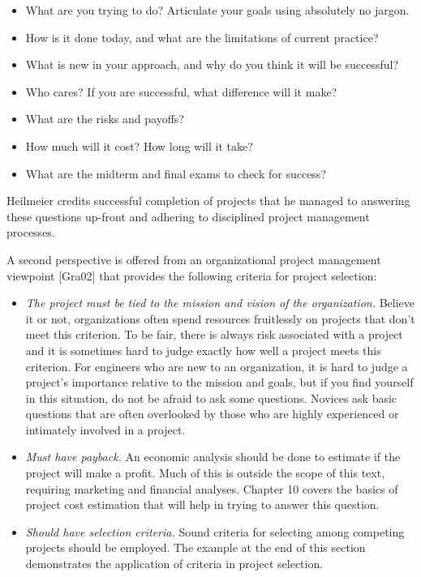 \begin{itemize}
\item
  What are you trying to do? Articulate your goals using absolutely no
  jargon.
\item
  How is it done today, and what are the limitations of current
  practice?
\item
  What is new in your approach, and why do you think it will be
  successful?
\item
  Who cares? If you are successful, what difference will it make?
\item
  What are the risks and payoffs?
\item
  How much will it cost? How long will it take?
\item
  What are the midterm and final exams to check for success?
\end{itemize}

Heilmeier credits successful completion of projects that he managed to
answering these questions up-front and adhering to disciplined project
management processes.

A second perspective is offered from an organizational project
management viewpoint {[}Gra02{]} that provides the following criteria
for project selection:

\begin{itemize}
\item
  \emph{The project must be tied to the mission and vision of the
  organization.} Believe it or not, organizations often spend resources
  fruitlessly on projects that don't meet this criterion. To be fair,
  there is always risk associated with a project and it is sometimes
  hard to judge exactly how well a project meets this criterion. For
  engineers who are new to an organization, it is hard to judge a
  project's importance relative to the mission and goals, but if you
  find yourself in this situation, do not be afraid to ask some
  questions. Novices ask basic questions that are often overlooked by
  those who are highly experienced or intimately involved in a project.
\item
  \emph{Must have payback.} An economic analysis should be done to
  estimate if the project will make a profit. Much of this is outside
  the scope of this text, requiring marketing and financial analyses.
  Chapter 10 covers the basics of project cost estimation that will help
  in trying to answer this question.
\item
  \emph{Should have selection criteria.} Sound criteria for selecting
  among competing projects should be employed. The example at the end of
  this section demonstrates the application of criteria in project
  selection.
\end{itemize}


